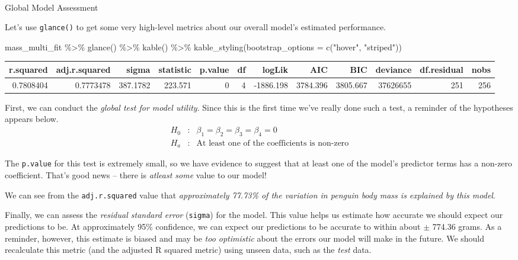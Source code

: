\documentclass[
  letterpaper,
  DIV=11,
  numbers=noendperiod]{scrartcl}
\makeatletter
\let\oldparagraph\paragraph
\renewcommand{\paragraph}{
    \@ifstar
      \xxxParagraphStar
      \xxxParagraphNoStar
  }
\newcommand{\xxxParagraphStar}[1]{\oldparagraph*{#1}\mbox{}}
\newcommand{\xxxParagraphNoStar}[1]{\oldparagraph{#1}\mbox{}}
\newenvironment{Shaded}{\begin{snugshade}}{\end{snugshade}}
\newcommand{\AttributeTok}[1]{\textcolor[rgb]{0.40,0.45,0.13}{#1}}
\newcommand{\FunctionTok}[1]{\textcolor[rgb]{0.28,0.35,0.67}{#1}}
\newcommand{\NormalTok}[1]{\textcolor[rgb]{0.00,0.23,0.31}{#1}}
\newcommand{\SpecialCharTok}[1]{\textcolor[rgb]{0.37,0.37,0.37}{#1}}
\newcommand{\StringTok}[1]{\textcolor[rgb]{0.13,0.47,0.30}{#1}}
\makeatother
\begin{document}
\paragraph{Global Model Assessment}\label{global-model-assessment}

Let's use \texttt{glance()} to get some very high-level metrics about
our overall model's estimated performance.

\begin{Shaded}
\begin{Highlighting}[]
\NormalTok{mass\_multi\_fit }\SpecialCharTok{\%\textgreater{}\%}
  \FunctionTok{glance}\NormalTok{() }\SpecialCharTok{\%\textgreater{}\%}
  \FunctionTok{kable}\NormalTok{() }\SpecialCharTok{\%\textgreater{}\%}
  \FunctionTok{kable\_styling}\NormalTok{(}\AttributeTok{bootstrap\_options =} \FunctionTok{c}\NormalTok{(}\StringTok{"hover"}\NormalTok{, }\StringTok{"striped"}\NormalTok{))}
\end{Highlighting}
\end{Shaded}

\begin{longtable}[t]{rrrrrrrrrrrr}
\toprule
r.squared & adj.r.squared & sigma & statistic & p.value & df & logLik & AIC & BIC & deviance & df.residual & nobs\\
\midrule
0.7808404 & 0.7773478 & 387.1782 & 223.571 & 0 & 4 & -1886.198 & 3784.396 & 3805.667 & 37626655 & 251 & 256\\
\bottomrule
\end{longtable}

First, we can conduct the \emph{global test for model utility}. Since
this is the first time we've really done such a test, a reminder of the
hypotheses appears below.
\[\begin{array}{lcl} H_0 & : & \beta_1 = \beta_2 = \beta_3 = \beta_4 = 0\\
H_a & : & \text{At least one of the coefficients is non-zero}\end{array}\]

The \texttt{p.value} for this test is extremely small, so we have
evidence to suggest that at least one of the model's predictor terms has
a non-zero coefficient. That's good news -- there is \emph{atleast some}
value to our model!

We can see from the \texttt{adj.r.squared} value that
\emph{approximately 77.73\% of the variation in penguin body mass is
explained by this model}.

Finally, we can assess the \emph{residual standard error}
(\texttt{sigma}) for the model. This value helps us estimate how
accurate we should expect our predictions to be. At approximately 95\%
confidence, we can expect our predictions to be accurate to within about
\(\pm\) 774.36 grams. As a reminder, however, this estimate is biased
and may be \emph{too optimistic} about the errors our model will make in
the future. We should recalculate this metric (and the adjusted R
squared metric) using unseen data, such as the \emph{test} data.
\end{document}
